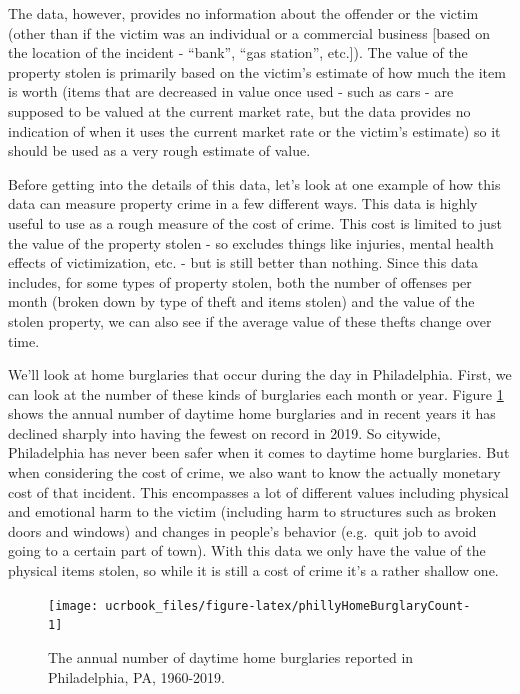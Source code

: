 \documentclass[
  12pt,
  openany]{book}
\begin{document}
The data, however, provides no information about the offender or the victim (other than if the victim was an individual or a commercial business {[}based on the location of the incident - ``bank'', ``gas station'', etc.{]}). The value of the property stolen is primarily based on the victim's estimate of how much the item is worth (items that are decreased in value once used - such as cars - are supposed to be valued at the current market rate, but the data provides no indication of when it uses the current market rate or the victim's estimate) so it should be used as a very rough estimate of value.

Before getting into the details of this data, let's look at one example of how this data can measure property crime in a few different ways. This data is highly useful to use as a rough measure of the cost of crime. This cost is limited to just the value of the property stolen - so excludes things like injuries, mental health effects of victimization, etc. - but is still better than nothing. Since this data includes, for some types of property stolen, both the number of offenses per month (broken down by type of theft and items stolen) and the value of the stolen property, we can also see if the average value of these thefts change over time.

We'll look at home burglaries that occur during the day in Philadelphia. First, we can look at the number of these kinds of burglaries each month or year. Figure \ref{fig:phillyHomeBurglaryCount} shows the annual number of daytime home burglaries and in recent years it has declined sharply into having the fewest on record in 2019. So citywide, Philadelphia has never been safer when it comes to daytime home burglaries. But when considering the cost of crime, we also want to know the actually monetary cost of that incident. This encompasses a lot of different values including physical and emotional harm to the victim (including harm to structures such as broken doors and windows) and changes in people's behavior (e.g.~quit job to avoid going to a certain part of town). With this data we only have the value of the physical items stolen, so while it is still a cost of crime it's a rather shallow one.

\begin{figure}

{\centering \texttt{[image: ucrbook\_files/figure-latex/phillyHomeBurglaryCount-1]} 

}

\caption{The annual number of daytime home burglaries reported in Philadelphia, PA, 1960-2019.}\label{fig:phillyHomeBurglaryCount}
\end{figure}
\end{document}
